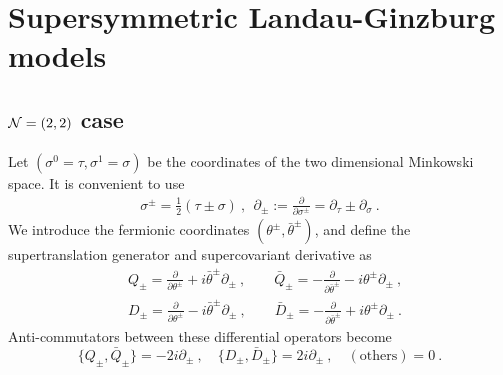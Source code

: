 \documentclass[a4paper,12pt]{article}
\numberwithin{equation}{section}
\newcommand{\del}{\partial}
\newcommand{\nn}{\nonumber\\}
\newcommand{\ta}{\theta}
\newcommand{\tb}{\bar{\theta}}
\newcommand{\deldel}[2]{\frac{\del #1}{\del #2}}
\newcommand{\Qb}{\bar{Q}}
\newcommand{\Db}{\bar{D}}
\begin{document}

\section{Supersymmetric Landau-Ginzburg models}
\subsection{${\cal N}= (2,2)$ case}
\label{22LG}

Let $(\sigma^{0}=\tau, \sigma^{1}=\sigma)$ be
  the coordinates of the two dimensional Minkowski space.
It is convenient to use
\begin{align}
 \sigma^{\pm} = \frac{1}{2} (\tau \pm \sigma) ~,~~
 \del_{\pm}:=\deldel{}{\sigma^{\pm}}=\del_{\tau}\pm \del_{\sigma}~.
\end{align}
We introduce the fermionic coordinates $(\ta^{\pm},\tb^{\pm})$, and
define the supertranslation generator and supercovariant derivative as
\begin{align}
 &Q_{\pm}=\deldel{}{\ta^{\pm}} + i \tb^{\pm}\del_{\pm}~,\qquad
 \Qb_{\pm}=-\deldel{}{\tb^{\pm}} - i \ta^{\pm}\del_{\pm}~,\nn
 &D_{\pm}=\deldel{}{\ta^{\pm}} - i \tb^{\pm}\del_{\pm}~,\qquad
 \Db_{\pm}=-\deldel{}{\tb^{\pm}} + i \ta^{\pm}\del_{\pm}~.
\end{align}
Anti-commutators between these differential operators become
\begin{equation}
 \{Q_{\pm},\Qb_{\pm}\}=-2i \del_{\pm}~,\quad
 \{D_{\pm},\Db_{\pm}\}= 2i \del_{\pm}~,\quad
  (\text{others})=0~.
\end{equation}
\end{document}
